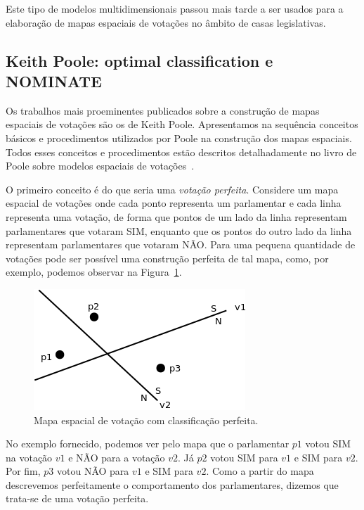 \documentclass[
	article,			%
	12pt,				%
	oneside,			%
	a4paper,			%
	english,			%
	brazil,				%
	sumario=tradicional,
	oldfontcommands %
	]{abntex2}
\newcommand\nay{NÃO\xspace}
\newcommand\yea{SIM\xspace}
\newcommand\nominate{NOMINATE\xspace}
\begin{document}
Este tipo de modelos multidimensionais passou mais tarde a ser usados para a elaboração de mapas espaciais de votações no âmbito de casas legislativas.

\subsection{Keith Poole: optimal classification e \nominate}

Os trabalhos mais proeminentes publicados sobre a construção de mapas espaciais de votações são os de Keith Poole. Apresentamos na sequência conceitos básicos e procedimentos utilizados por Poole na construção dos mapas espaciais. Todos esses conceitos e procedimentos estão descritos detalhadamente no livro de Poole sobre modelos espaciais de votações~\cite{poole2005book}.

O primeiro conceito é do que seria uma \emph{votação perfeita}. Considere um mapa espacial de votações onde cada ponto representa um parlamentar e cada linha representa uma votação, de forma que pontos de um lado da linha representam parlamentares que votaram \yea, enquanto que os pontos do outro lado da linha representam parlamentares que votaram \nay. Para uma pequena quantidade de votações pode ser possível uma construção perfeita de tal mapa, como, por exemplo, podemos observar na Figura~\ref{fig:mapa-classificacao-perfeita}.

\begin{figure}[h]
  \centering
  \includegraphics[scale=0.7]{figs/votacao-perfeita.png}
  \caption{Mapa espacial de votação com classificação perfeita.}
  \label{fig:mapa-classificacao-perfeita}
\end{figure}

No exemplo fornecido, podemos ver pelo mapa que o parlamentar $p1$ votou \yea na votação $v1$ e \nay para a votação $v2$. Já $p2$ votou \yea para $v1$ e \yea para $v2$. Por fim, $p3$ votou \nay para $v1$ e \yea para $v2$. Como a partir do mapa descrevemos perfeitamente o comportamento dos parlamentares, dizemos que trata-se de uma votação perfeita.
\end{document}
